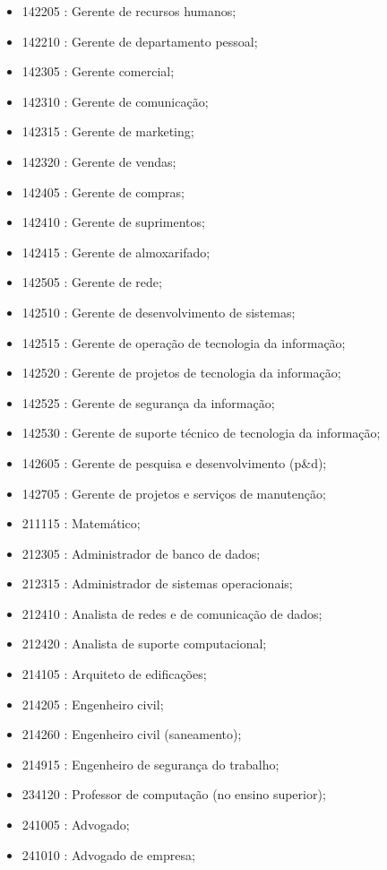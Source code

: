 \begin{itemize}
\begin{itemize}
\begin{itemize}
      \item 142205 : Gerente de recursos humanos;
      \item 142210 : Gerente de departamento pessoal;
      \item 142305 : Gerente comercial;
      \item 142310 : Gerente de comunicação;
      \item 142315 : Gerente de marketing;
      \item 142320 : Gerente de vendas;
      \item 142405 : Gerente de compras;
      \item 142410 : Gerente de suprimentos;
      \item 142415 : Gerente de almoxarifado;
      \item 142505 : Gerente de rede;
      \item 142510 : Gerente de desenvolvimento de sistemas;
      \item 142515 : Gerente de operação de tecnologia da informação;
      \item 142520 : Gerente de projetos de tecnologia da informação;
      \item 142525 : Gerente de segurança da informação;
      \item 142530 : Gerente de suporte técnico de tecnologia da informação;
      \item 142605 : Gerente de pesquisa e desenvolvimento (p\&d);
      \item 142705 : Gerente de projetos e serviços de manutenção;
      \item 211115 : Matemático;
      \item 212305 : Administrador de banco de dados;
      \item 212315 : Administrador de sistemas operacionais;
      \item 212410 : Analista de redes e de comunicação de dados;
      \item 212420 : Analista de suporte computacional;
      \item 214105 : Arquiteto de edificações;
      \item 214205 : Engenheiro civil;
      \item 214260 : Engenheiro civil (saneamento);
      \item 214915 : Engenheiro de segurança do trabalho;
      \item 234120 : Professor de computação (no ensino superior);
      \item 241005 : Advogado;
      \item 241010 : Advogado de empresa;

\end{itemize}
\end{itemize}
\end{itemize}
